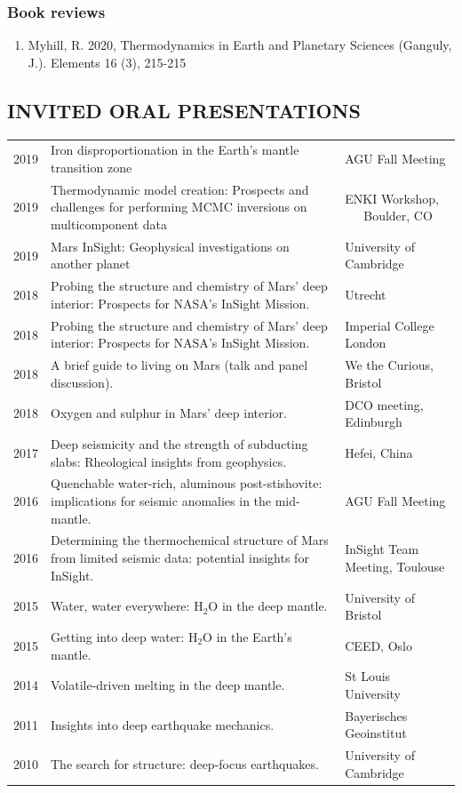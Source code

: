 \documentclass[11pt,twoside,a4paper]{article}
\begin{document}
\subsubsection*{Book reviews}
\begin{enumerate}
\item Myhill, R. 2020, Thermodynamics in Earth and Planetary Sciences (Ganguly, J.). Elements 16 (3), 215-215
\end{enumerate}

\clearpage
\subsection*{INVITED ORAL PRESENTATIONS}

\vspace{-0.5em}
\begin{table}[!ht]
\centering
\begin{tabular}{L{2cm} L{10cm} L{5cm}}
  2019 \vfill & Iron disproportionation in the Earth's mantle transition zone & AGU Fall Meeting \vfill \\
  2019 \vfill & Thermodynamic model creation: Prospects and challenges for performing MCMC inversions on multicomponent data & ENKI Workshop, \,\,\,\,\,\,\,\,\,Boulder, CO \\
  2019 & Mars InSight: Geophysical investigations on another planet & University of Cambridge \\
2018 \vfill & Probing the structure and chemistry of Mars' deep interior: Prospects for NASA's InSight Mission. & Utrecht \vfill \\
2018 \vfill & Probing the structure and chemistry of Mars' deep interior: Prospects for NASA's InSight Mission. & Imperial College London \vfill \\
2018 & A brief guide to living on Mars (talk and panel discussion). & We the Curious, Bristol \\
2018 & Oxygen and sulphur in Mars' deep interior. & DCO meeting, Edinburgh \\
2017 \vfill & Deep seismicity and the strength of subducting slabs: Rheological insights from geophysics. & Hefei, China \vfill \\
2016 \vfill & Quenchable water-rich, aluminous post-stishovite: implications for seismic anomalies in the mid-mantle. & AGU Fall Meeting \vfill \\
2016 \vfill & Determining the thermochemical structure of Mars from limited seismic data: potential insights for InSight. & InSight Team Meeting, Toulouse\\
2015 & Water, water everywhere: H$_2$O in the deep mantle. & University of Bristol \\
2015 & Getting into deep water: H$_2$O in the Earth's mantle. & CEED, Oslo \\
2014 & Volatile-driven melting in the deep mantle. & St Louis University \\
2011 & Insights into deep earthquake mechanics. & Bayerisches Geoinstitut \\
2010 & The search for structure: deep-focus earthquakes. & University of Cambridge \\
\end{tabular}
\end{table}
\end{document}
